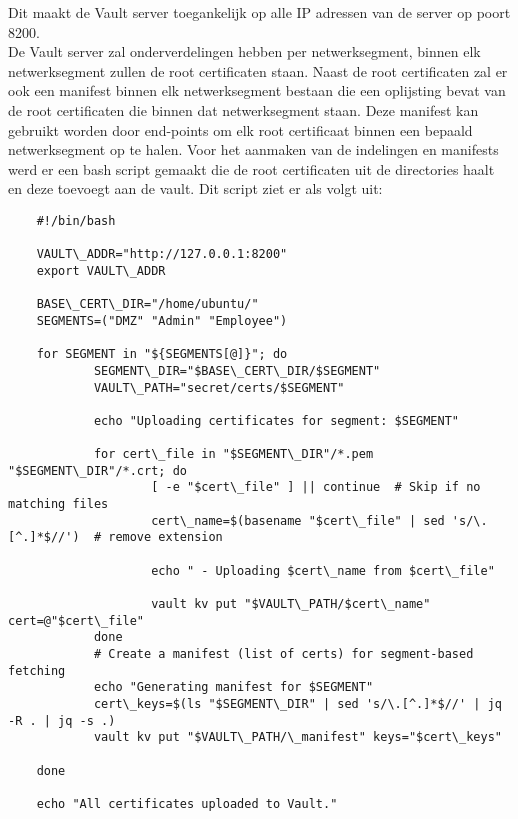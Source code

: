 Dit maakt de Vault server toegankelijk op alle IP adressen van de server op poort 8200. \\
De Vault server zal onderverdelingen hebben per netwerksegment, binnen elk netwerksegment zullen de root certificaten staan. Naast de root certificaten zal er ook een manifest binnen elk netwerksegment bestaan die een oplijsting bevat van de root certificaten die binnen dat netwerksegment staan. 
Deze manifest kan gebruikt worden door end-points om elk root certificaat binnen een bepaald netwerksegment op te halen. Voor het aanmaken van de indelingen en manifests werd er een bash script gemaakt die de root certificaten uit de directories haalt en deze toevoegt aan de vault. Dit script ziet er als volgt uit:
\begin{verbatim}
    #!/bin/bash

    VAULT\_ADDR="http://127.0.0.1:8200"
    export VAULT\_ADDR

    BASE\_CERT\_DIR="/home/ubuntu/"
    SEGMENTS=("DMZ" "Admin" "Employee")

    for SEGMENT in "${SEGMENTS[@]}"; do
            SEGMENT\_DIR="$BASE\_CERT\_DIR/$SEGMENT"
            VAULT\_PATH="secret/certs/$SEGMENT"

            echo "Uploading certificates for segment: $SEGMENT"

            for cert\_file in "$SEGMENT\_DIR"/*.pem "$SEGMENT\_DIR"/*.crt; do
                    [ -e "$cert\_file" ] || continue  # Skip if no matching files
                    cert\_name=$(basename "$cert\_file" | sed 's/\.[^.]*$//')  # remove extension

                    echo " - Uploading $cert\_name from $cert\_file"

                    vault kv put "$VAULT\_PATH/$cert\_name" cert=@"$cert\_file"
            done
            # Create a manifest (list of certs) for segment-based fetching
            echo "Generating manifest for $SEGMENT"
            cert\_keys=$(ls "$SEGMENT\_DIR" | sed 's/\.[^.]*$//' | jq -R . | jq -s .)
            vault kv put "$VAULT\_PATH/\_manifest" keys="$cert\_keys"

    done

    echo "All certificates uploaded to Vault."

\end{verbatim}

